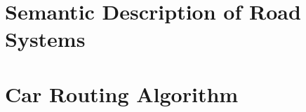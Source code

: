 \chapter{Semantic Description of Road Systems}
\label{ch:descriptionOfRoadSystems}

\chapter{Car Routing Algorithm}
\label{ch:gps}